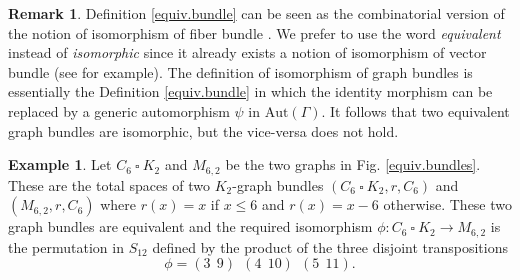 \documentclass{amsart}
\theoremstyle{definition}
\newtheorem{rem}[theo]{Remark}
\newtheorem{example}[theo]{Example}
\numberwithin{equation}{section}
\begin{document}
\begin{rem}
 Definition \ref{equiv.bundle} can be seen as the combinatorial version of the notion of isomorphism of fiber bundle \cite{ttd}. We prefer to use the word \textit{equivalent} instead of \textit{isomorphic} since it already exists a notion of isomorphism of vector bundle (see \cite{kwak} for example). The definition of isomorphism of graph bundles is essentially the Definition \ref{equiv.bundle} in which the identity morphism can be replaced by a generic automorphism $\psi$ in $\mathrm{Aut}(\Gamma)$. It follows that two equivalent graph bundles are isomorphic, but the vice-versa does not hold.
\end{rem}

\begin{example}\label{exem.trivia.}
Let $C_6 \ \square  \ K_2$ and $M_{6,2}$ be the two graphs in Fig. \ref{equiv.bundles}. These are the total spaces of two $K_2$-graph bundles $(C_6  \ \square \  K_2, r, C_6)$ and $(M_{6,2}, r, C_6)$ where $r(x) = x$ if $x \leq 6$ and $r(x) = x-6$ otherwise. These two graph bundles are equivalent and the required isomorphism $\phi: C_6 \ \square  \  K_2 \longrightarrow M_{6,2}$ is the permutation in $S_{12}$ defined by the product of the three disjoint transpositions \begin{equation}\phi = (3  \ \ 9) \ \ (4 \ \ 10) \ \ (5 \ \ 11).\end{equation}


\begin{figure}[h]
\end{figure}
\end{example}
\end{document}
